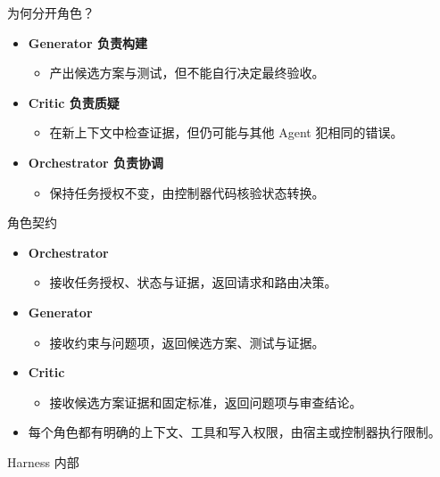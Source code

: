 \begin{frame}{为何分开角色？}
\begin{itemize}
\item \textbf{Generator 负责构建}
\begin{itemize}
\item 产出候选方案与测试，但不能自行决定最终验收。
\end{itemize}
\item \textbf{Critic 负责质疑}
\begin{itemize}
\item 在新上下文中检查证据，但仍可能与其他 Agent 犯相同的错误。
\end{itemize}
\item \textbf{Orchestrator 负责协调}
\begin{itemize}
\item 保持任务授权不变，由控制器代码核验状态转换。
\end{itemize}
\end{itemize}
\end{frame}

\begin{frame}{角色契约}
\begin{itemize}
\item \textbf{Orchestrator}
\begin{itemize}
\item 接收任务授权、状态与证据，返回请求和路由决策。
\end{itemize}
\item \textbf{Generator}
\begin{itemize}
\item 接收约束与问题项，返回候选方案、测试与证据。
\end{itemize}
\item \textbf{Critic}
\begin{itemize}
\item 接收候选方案证据和固定标准，返回问题项与审查结论。
\end{itemize}
\item 每个角色都有明确的上下文、工具和写入权限，由宿主或控制器执行限制。
\end{itemize}
\end{frame}

\begin{frame}{Harness 内部}
\begin{center}
\resizebox{.92\textwidth}{!}{}
\end{center}
\end{frame}

